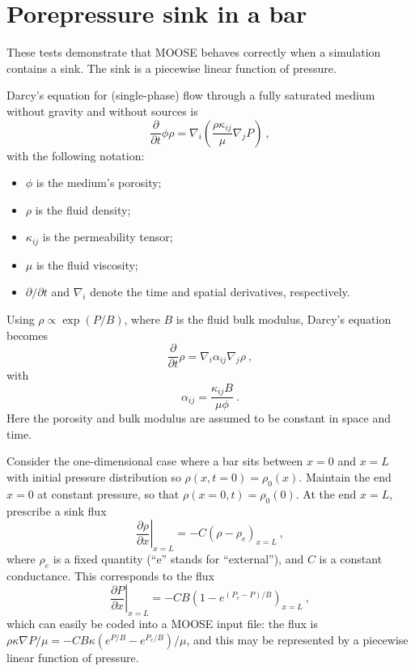 \documentclass[]{scrreprt}
\begin{document}
\chapter{Porepressure sink in a bar}
\label{pp.sec}

These tests demonstrate that MOOSE behaves correctly when a simulation
contains a sink.  The sink is a piecewise linear function of pressure.

Darcy's equation for (single-phase) flow through a fully saturated medium without
gravity and without sources is
\begin{equation}
\frac{\partial}{\partial t}\phi\rho = \nabla_{i}\left(\frac{\rho
  \kappa_{ij}}{\mu} \nabla_{j}P \right) \ ,
\end{equation}
with the following notation:
\begin{itemize}
\item $\phi$ is the medium's porosity;
\item $\rho$ is the fluid density;
\item $\kappa_{ij}$ is the permeability tensor;
\item $\mu$ is the fluid viscosity;
\item $\partial/\partial t$ and $\nabla_{i}$ denote the time and spatial derivatives, respectively.
\end{itemize}
Using $\rho \propto
\exp(P/B)$, where $B$ is the fluid bulk modulus, Darcy's equation
becomes
\begin{equation}
\frac{\partial}{\partial t}\rho = \nabla_{i}\alpha_{ij}\nabla_{j}\rho \ ,
\end{equation}
with
\begin{equation}
\alpha_{ij} = \frac{\kappa_{ij}B}{\mu\phi} \ .
\end{equation}
Here the porosity and bulk modulus are assumed to be constant in space
and time.

Consider the one-dimensional case where a bar sits between $x=0$ and
$x=L$ with initial pressure distribution so $\rho(x,t=0) = \rho_{0}(x)$.
Maintain the end $x=0$ at constant pressure, so that $\rho(x=0, t) =
\rho_{0}(0)$.  At the end $x=L$, prescribe a sink flux
\begin{equation}
\left.\frac{\partial\rho}{\partial x}\right|_{x=L} = -C\left(\rho -
\rho_{e}\right)_{x=L} \ ,
\end{equation}
where $\rho_{e}$ is a fixed quantity (``e'' stands for ``external''),
and $C$ is a constant conductance.  This corresponds to the flux
\begin{equation}
\left.\frac{\partial P}{\partial x}\right|_{x=L} = -CB\left(1 -
e^{(P_{e}-P)/B}\right)_{x=L} \ ,
\end{equation}
which can easily be coded into a MOOSE input file: the flux is
$\rho\kappa\nabla P/\mu = -CB\kappa(e^{P/B} - e^{P_{e}/B})/\mu$, and
this may be represented by a piecewise linear function of pressure.
\end{document}

